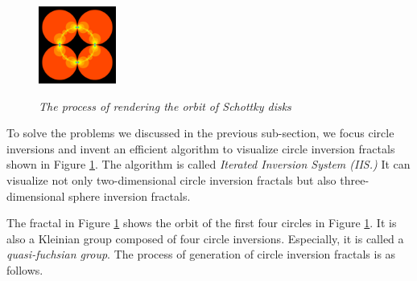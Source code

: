 \begin{figure}[htbp]
\begin{minipage}[t]{0.16\hsize}
  \subcaption{}
  \label{fig:level2}
 \end{minipage}
 \begin{minipage}[t]{0.16\hsize}
  \center
  \includegraphics[width=1in, height=1in, keepaspectratio]{img/preparation/orbit/levelMaxc.pdf}
  \subcaption{}
  \label{fig:levelMax}
 \end{minipage}
 \caption{\textit{The process of rendering the orbit of Schottky disks}}
 \label{fig:schottkyProcess}
\end{figure}

\noindent To solve the problems we discussed in the previous sub-section,
we focus circle inversions and invent an efficient algorithm to
visualize circle inversion fractals shown in Figure \ref{fig:schottkyProcess}.
The algorithm is called \textit{Iterated Inversion System (IIS.)}
It can visualize not only two-dimensional circle inversion fractals but
also three-dimensional sphere inversion fractals.

The fractal in Figure \ref{fig:schottkyProcess} shows the orbit of the first
four circles in Figure \ref{fig:schottkyProcess}. %
It is also a Kleinian group composed of four circle inversions.
Especially, it is called a \textit{quasi-fuchsian group}.
The process of generation of circle inversion fractals is
as follows.

